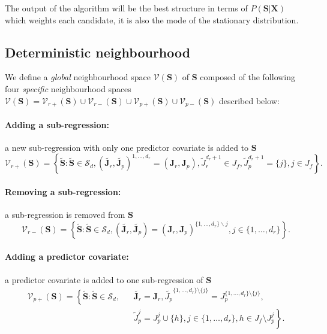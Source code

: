 \documentclass[12pt,a4paper]{report}
\begin{document}
The output of the algorithm will be the best structure in terms of $P(\boldsymbol{S}|\boldsymbol{X})$ which weights each candidate, it is also the mode of the stationary distribution.
	
		\subsection{Deterministic neighbourhood}
	
We define a {\it global} neighbourhood space $\mathcal{V}(\boldsymbol{S})$ of $\boldsymbol{S}$ composed of the following four {\it specific} neighbourhood spaces $\mathcal{V}(\boldsymbol{S})=\mathcal{V}_{r+}(\boldsymbol{S})\cup\mathcal{V}_{r-}(\boldsymbol{S})\cup\mathcal{V}_{p+}(\boldsymbol{S})\cup\mathcal{V}_{p-}(\boldsymbol{S})$ described below:
	\paragraph{Adding a sub-regression:} a new sub-regression with only one predictor covariate is added to $\boldsymbol{S}$
\begin{equation}
\mathcal{V}_{r+}(\boldsymbol{S}) = \left\{\tilde{\boldsymbol{S}}: \tilde{\boldsymbol{S}}\in\mathcal{S}_d, (\tilde{\boldsymbol{J}_r},\tilde{\boldsymbol{J}_p})^{1,\ldots,d_r}=(\boldsymbol{J}_r,\boldsymbol{J}_p), \tilde{J}_r^{d_r+1}\in J_f, \tilde{J}_p^{d_r+1}=\{j\}, j\in J_f \right\}. \nonumber
\end{equation}	
		\paragraph{Removing a sub-regression:} a sub-regression  is removed from $\boldsymbol{S}$
\begin{equation}
\mathcal{V}_{r-}(\boldsymbol{S}) = \left\{\tilde{\boldsymbol{S}}: \tilde{\boldsymbol{S}}\in\mathcal{S}_d, (\tilde{\boldsymbol{J}_r},\tilde{\boldsymbol{J}_p})=(\boldsymbol{J}_r,\boldsymbol{J}_p)^{\{1,\ldots,d_r\}\backslash j}, j\in\{1,\ldots,d_r\} \right\}. \nonumber
\end{equation}	
	\paragraph{Adding a predictor covariate:} a predictor covariate is added to one sub-regression of $\boldsymbol{S}$
\begin{eqnarray}
\mathcal{V}_{p+}(\boldsymbol{S}) = \left\{\tilde{\boldsymbol{S}}:  \tilde{\boldsymbol{S}}\in\mathcal{S}_d,\right. && \tilde{\boldsymbol{J}_r}=\boldsymbol{J}_r, \tilde{J_p}^{\{1,\dots,d_r \}\setminus \{j\}}=J_p^{\{1,\dots,d_r \}\setminus \{j\}} , \nonumber \\
& & \left. \tilde{J}_p^{j}=J_p^{j} \cup \{h\}, j\in \{1,\ldots,d_r\}, h\in J_f \setminus J_p^j\right\}. \nonumber
\end{eqnarray}
\end{document}
